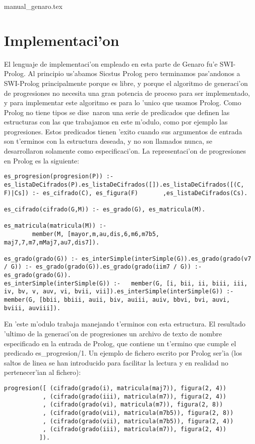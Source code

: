 ﻿manual_genaro.tex\documentclass[a4paper,12pt]{article}
\begin{document}
\section {Implementaci'on}
El lenguaje de implementaci'on empleado en esta parte de Genaro fu'e SWI-Prolog. Al principio us'abamos Sicstus Prolog pero terminamos pas'andonos a SWI-Prolog principalmente porque es libre, y porque el algoritmo de generaci'on de progresiones no necesita una gran potencia de proceso para ser implementado, y para implementar este algoritmo es para lo 'unico que usamos Prolog.
\newline
Como Prolog no tiene tipos se dise~naron una serie de predicados que definen las estructuras con las que trabajamos en este m'odulo, como por ejemplo las progresiones. Estos predicados tienen 'exito cuando sus argumentos de entrada son t'erminos con la estructura deseada, y no son llamados nunca, se desarrollaron solamente como especificaci'on.
\newline
La representaci'on de progresiones en Prolog es la siguiente:
        \begin{verbatim}
es_progresion(progresion(P)) :- es_listaDeCifrados(P).es_listaDeCifrados([]).es_listaDeCifrados([(C, F)|Cs]) :- es_cifrado(C), es_figura(F)       ,es_listaDeCifrados(Cs).

es_cifrado(cifrado(G,M)) :- es_grado(G), es_matricula(M).

es_matricula(matricula(M)) :- 
        member(M, [mayor,m,au,dis,6,m6,m7b5, maj7,7,m7,mMaj7,au7,dis7]).

es_grado(grado(G)) :- es_interSimple(interSimple(G)).es_grado(grado(v7 / G)) :- es_grado(grado(G)).es_grado(grado(iim7 / G)) :- es_grado(grado(G)).
es_interSimple(interSimple(G)) :-	member(G, [i, bii, ii, biii, iii, iv, bv, v, auv, vi, bvii, vii]).es_interSimple(interSimple(G)) :-	member(G, [bbii, bbiii, auii, biv, auiii, auiv, bbvi, bvi, auvi, bviii, auviii]).
        \end{verbatim}
En 'este m'odulo trabaja manejando t'erminos con esta estructura. El resultado 'ultimo de la generaci'on de progresiones un archivo de texto de nombre especificado en la entrada de Prolog, que contiene un t'ermino que cumple el predicado es\_progresion/1. Un ejemplo de fichero escrito por Prolog ser'ia (los saltos de linea se han introducido para facilitar la lectura y en realidad no pertenecer'ian al fichero):
        \begin{verbatim}
progresion([ (cifrado(grado(i), matricula(maj7)), figura(2, 4))
           , (cifrado(grado(iii), matricula(m7)), figura(2, 4))
           , (cifrado(grado(vi), matricula(m7)), figura(2, 8))
           , (cifrado(grado(vii), matricula(m7b5)), figura(2, 8))
           , (cifrado(grado(vii), matricula(m7b5)), figura(2, 4))
           , (cifrado(grado(iii), matricula(m7)), figura(2, 4))
          ]).
        \end{verbatim}
\end{document}
